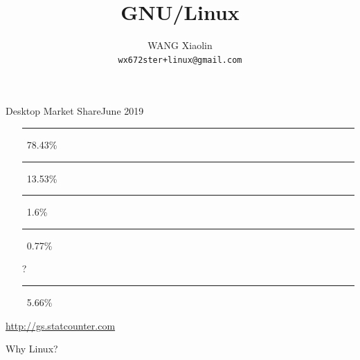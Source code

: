 \newcommand{\iOS}{\textcolor{orange}{\nerd }}

\title{GNU/Linux}
\author{WANG Xiaolin\\{\footnotesize \texttt{wx672ster+linux@gmail.com}}}



\frame{\titlepage}

\begin{frame}{Desktop Market Share}{June 2019}
  \begin{itemize}
  \item[\win] \textcolor{SkyBlue}{\rule{.7843\textwidth}{2mm}}\,
    78.43\%    
  \item[\apple] \textcolor{LightGray}{\rule{.1353\textwidth}{2mm}}\,
    13.53\%
  \item[\linux] \rule{.016\textwidth}{2mm}\, 1.6\%
  \item[\chrome] \textcolor{Orange}{\rule{.0077\textwidth}{2mm}}\,
    0.77\%
  \item[?] \textcolor{Green}{\rule{.0566\textwidth}{2mm}}\, 5.66\%
  \end{itemize}
  \begin{flushright}
    \tiny \url{http://gs.statcounter.com}
  \end{flushright}
  \begin{center}
    \Huge\purisa Why Linux?
  \end{center}
  


\end{frame}
